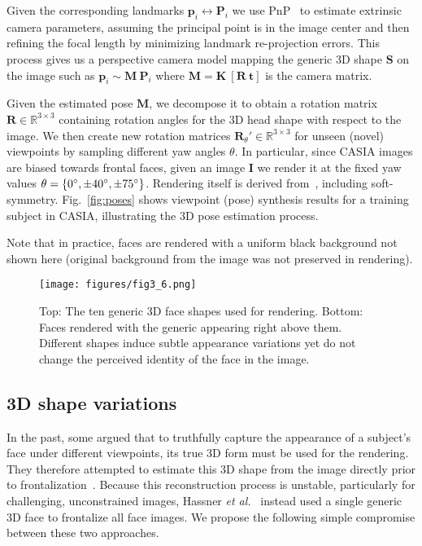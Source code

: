 \documentclass[runningheads]{llncs}
\def\mbf#1{\mathbf{#1}}
\begin{document}
Given the corresponding landmarks $\mbf{p}_i \leftrightarrow \mbf{P}_i$ we use PnP~\cite{hartley2003multiple} to estimate extrinsic camera parameters, assuming the principal point is in the image center and then refining the focal length by minimizing landmark re-projection errors. This process gives us a perspective camera model mapping the generic 3D
shape $\mbf{S}$ on the image such as $\mbf{p}_i \sim \mbf{M}~\mbf{P}_i$ where $\mbf{M} = \mbf{K}~\left[ \mbf{R}~\mbf{t} \right]$ is the camera matrix. 

Given the estimated pose $\mbf{M}$, we decompose it to obtain a rotation matrix $\mbf{R} \in \mathbb{R}^{3 \times 3}$ containing rotation angles for the 3D head shape with respect to the image. We then create new rotation matrices $\mbf{R}_{\theta}' \in \mathbb{R}^{3 \times 3}$ for unseen (novel) viewpoints by sampling different yaw angles $\theta$. In particular, since CASIA images are biased towards frontal faces, given an image $\mbf{I}$ we render it at the fixed yaw values $\theta = \{ 0\degree, \pm40\degree, \pm75\degree \}$.
Rendering itself is derived from~\cite{hassner2015effective}, including soft-symmetry. Fig.~\ref{fig:poses} shows viewpoint (pose) synthesis results for a training subject in CASIA, illustrating the 3D pose estimation process.

Note that in practice, faces are rendered with a uniform black background not shown here (original background from the image was not preserved in rendering).



\begin{figure}[t]
\centering

\texttt{[image: figures/fig3\_6.png]} 
\caption{Top: The ten generic 3D face shapes used for rendering. Bottom: Faces rendered with the generic appearing right above them. Different shapes induce subtle appearance variations yet do not change the perceived identity of the face in the image.}
\label{fig:shapes}
\end{figure}



\subsection{3D shape variations}\label{sec:3d}
In the past, some argued that to truthfully capture the appearance of a subject's face under different viewpoints, its true 3D form must be used for the rendering. They therefore attempted to estimate this 3D shape from the image directly prior to frontalization~\cite{taigman2014deepface}. Because this reconstruction process is unstable, particularly for challenging, unconstrained images, Hassner \emph{et al.}~\cite{hassner2015effective} instead used a single generic 3D face to frontalize all face images. We propose the following simple compromise between these two approaches.
\end{document}
